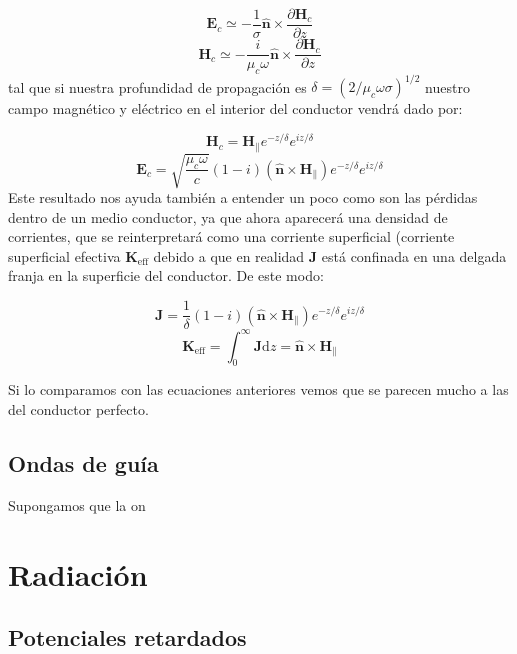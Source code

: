 \documentclass[12pt,a4paper]{article}
\newcommand{\parciales}[2]{\frac{\partial #1}{\partial #2}}
\newcommand{\D}{\mathrm{d}}
\newcommand{\En}{\mathbf{E}}
\newcommand{\Hn}{\mathbf{H}}
\newcommand{\Jn}{\mathbf{J}}
\newcommand{\Kn}{\mathbf{K}}
\newcommand{\hnn}{\hat{\mathbf{n}}}
\numberwithin{equation}{section}
\numberwithin{figure}{section}
\begin{document}
\begin{equation}
\En_c \simeq - \dfrac{1}{\sigma} \hnn \times \parciales{\Hn_c}{z}
\end{equation}
\begin{equation}
\Hn_c \simeq - \dfrac{i}{\mu_c \omega} \hnn \times \parciales{\Hn_c}{z}
\end{equation}
tal que si nuestra profundidad de propagación es $\delta=(2/\mu_c \omega \sigma)^{1/2}$ nuestro campo magnético y eléctrico en el interior del conductor vendrá dado por:

\begin{equation}
\Hn_c = \Hn_\| e^{-z/\delta}e^{iz/\delta}
\end{equation}
\begin{equation}
\En_c = \sqrt{\dfrac{\mu_c \omega}{c}} (1-i) (\hnn \times \Hn_\|) e^{-z/\delta}e^{iz/\delta}
\end{equation}
Este resultado nos ayuda también a entender un poco como son las pérdidas dentro de un medio conductor, ya que ahora aparecerá una densidad de corrientes, que se reinterpretará como una corriente superficial (corriente superficial efectiva $\Kn_{\mathrm{eff}}$ debido a que en realidad $\Jn$ está confinada en una delgada franja en la superficie del conductor. De este modo:

\begin{equation}
\Jn = \dfrac{1}{\delta} (1-i) (\hnn \times \Hn_\|) e^{-z/\delta}e^{iz/\delta}
\end{equation}
\begin{equation}
\Kn_{\mathrm{eff}} = \int_{0}^\infty \Jn \D z = \hnn \times \Hn_{\|}
\end{equation}

Si lo comparamos con las ecuaciones anteriores vemos que se parecen mucho a las del conductor perfecto.

\subsection{Ondas de guía}

Supongamos que la on

\newpage

\section{Radiación}

\subsection{Potenciales retardados}
\end{document}
